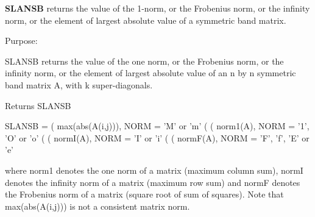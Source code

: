 {\bfseries S\+L\+A\+N\+S\+B} returns the value of the 1-\/norm, or the Frobenius norm, or the infinity norm, or the element of largest absolute value of a symmetric band matrix. 

 \begin{DoxyParagraph}{Purpose\+: }
\begin{DoxyVerb} SLANSB  returns the value of the one norm,  or the Frobenius norm, or
 the  infinity norm,  or the element of  largest absolute value  of an
 n by n symmetric band matrix A,  with k super-diagonals.\end{DoxyVerb}

\end{DoxyParagraph}
\begin{DoxyReturn}{Returns}
S\+L\+A\+N\+S\+B \begin{DoxyVerb}    SLANSB = ( max(abs(A(i,j))), NORM = 'M' or 'm'
             (
             ( norm1(A),         NORM = '1', 'O' or 'o'
             (
             ( normI(A),         NORM = 'I' or 'i'
             (
             ( normF(A),         NORM = 'F', 'f', 'E' or 'e'

 where  norm1  denotes the  one norm of a matrix (maximum column sum),
 normI  denotes the  infinity norm  of a matrix  (maximum row sum) and
 normF  denotes the  Frobenius norm of a matrix (square root of sum of
 squares).  Note that  max(abs(A(i,j)))  is not a consistent matrix norm.\end{DoxyVerb}
 
\end{DoxyReturn}

